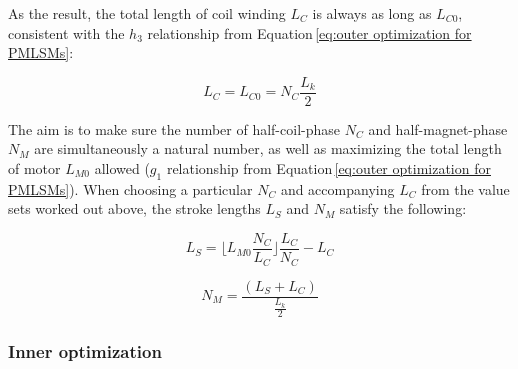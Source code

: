         
            As the result, the total length of coil winding $L_C$ is always as long as $L_{C0}$, consistent with the $h_3$ relationship from Equation\,\ref{eq:outer optimization for PMLSMs}:
            
            
            \begin{equation}
                L_C = L_{C0} = N_C \frac{L_k}{2}
                \label{eq:L_C and L_C0}
            \end{equation}
            
            
            The aim is to make sure the number of half-coil-phase $N_C$ and half-magnet-phase $N_M$ are simultaneously a natural number, as well as maximizing the total length of motor $L_{M0}$ allowed ($g_1$ relationship from Equation\,\ref{eq:outer optimization for PMLSMs}). When choosing a particular $N_C$ and accompanying $L_C$ from the value sets worked out above, the stroke lengths $L_S$ and $N_M$ satisfy the following:
            
            
            \begin{equation}
                L_S = \bigg\lfloor L_{M0}\frac{ N_C}{L_C} \bigg\rfloor \frac{L_C}{N_C}-L_C
                \label{eq:L_S}
            \end{equation}
            
            
            \begin{equation}
                N_M = \frac{(L_S+L_C)}{\frac{L_k}{2}}
                \label{eq:N_M}
            \end{equation}
            
            
        \subsubsection{Inner optimization}      \label{Chapter:PMLSM design HM/design optimization/optimization formulation/inner}
            
            
                

